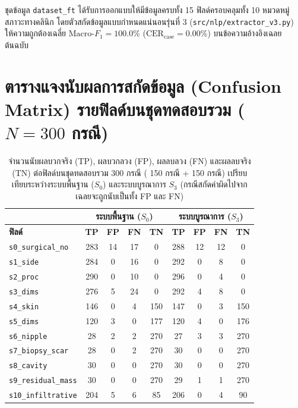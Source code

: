 \noindent ชุดข้อมูล \texttt{dataset\_ft} ได้รับการออกแบบให้มีข้อมูลครบทั้ง 15 ฟิลด์ครอบคลุมทั้ง 10 หมวดหมู่สภาวะทางคลินิก โดยตัวสกัดข้อมูลแบบกำหนดแน่นอนรุ่นที่ 3 (\texttt{src/nlp/extractor\_v3.py}) ให้ความถูกต้องเฉลี่ย $\text{Macro-}F_1 = 100.0\%$ ($\text{CER}_{\text{case}} = 0.00\%$) บนข้อความอ้างอิงเฉลยต้นฉบับ

\section*{ตารางแจงนับผลการสกัดข้อมูล (Confusion Matrix) รายฟิลด์บนชุดทดสอบรวม ($N = 300$ กรณี)}

\begin{table}[H]
\centering
\caption{จำนวนนับผลบวกจริง (TP), ผลบวกลวง (FP), ผลลบลวง (FN) และผลลบจริง (TN) ต่อฟิลด์บนชุดทดสอบรวม 300 กรณี ( 150 กรณี +  150 กรณี) เปรียบเทียบระหว่างระบบพื้นฐาน ($S_0$) และระบบบูรณาการ $S_3$ (กรณีสกัดค่าผิดไปจากเฉลยจะถูกนับเป็นทั้ง FP และ FN)}
\label{tab:confmat}
\footnotesize\setlength{\tabcolsep}{4pt}
\begin{tabular}{|l|c|c|c|c||c|c|c|c|}
\hline
 & \multicolumn{4}{c||}{\textbf{ระบบพื้นฐาน ($S_0$)}} & \multicolumn{4}{c|}{\textbf{ระบบบูรณาการ ($S_3$)}} \\
\hline
\textbf{ฟิลด์} & \textbf{TP} & \textbf{FP} & \textbf{FN} & \textbf{TN} & \textbf{TP} & \textbf{FP} & \textbf{FN} & \textbf{TN} \\
\hline
\texttt{s0\_surgical\_no} & 283 & 14 & 17 & 0 & 288 & 12 & 12 & 0 \\
\hline
\texttt{s1\_side} & 284 & 0 & 16 & 0 & 292 & 0 & 8 & 0 \\
\hline
\texttt{s2\_proc} & 290 & 0 & 10 & 0 & 296 & 0 & 4 & 0 \\
\hline
\texttt{s3\_dims} & 276 & 5 & 24 & 0 & 292 & 4 & 8 & 0 \\
\hline
\texttt{s4\_skin} & 146 & 0 & 4 & 150 & 147 & 0 & 3 & 150 \\
\hline
\texttt{s5\_dims} & 120 & 3 & 0 & 177 & 120 & 4 & 0 & 176 \\
\hline
\texttt{s6\_nipple} & 28 & 2 & 2 & 270 & 27 & 3 & 3 & 270 \\
\hline
\texttt{s7\_biopsy\_scar} & 28 & 0 & 2 & 270 & 30 & 0 & 0 & 270 \\
\hline
\texttt{s8\_cavity} & 30 & 0 & 0 & 270 & 30 & 0 & 0 & 270 \\
\hline
\texttt{s9\_residual\_mass} & 30 & 0 & 0 & 270 & 29 & 1 & 1 & 270 \\
\hline
\texttt{s10\_infiltrative} & 204 & 5 & 6 & 85 & 206 & 0 & 4 & 90 \\

\end{tabular}
\end{table}
